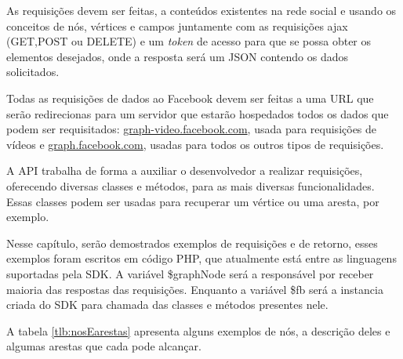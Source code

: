 As requisições devem ser feitas, a conteúdos existentes na rede social e usando os conceitos de nós, vértices e campos juntamente com as requisições ajax (GET,POST ou DELETE) e um \textit{token} de acesso para que se possa obter os elementos desejados, onde a resposta será um JSON contendo os dados solicitados.

Todas as requisições de dados ao Facebook devem ser feitas a uma URL que serão redirecionas para um servidor que estarão hospedados todos os dados que podem ser requisitados: \url{graph-video.facebook.com}, usada para requisições de vídeos e \url{graph.facebook.com}, usadas para todos os outros tipos de requisições.

A API trabalha de forma a auxiliar o desenvolvedor a realizar requisições, oferecendo diversas classes e métodos, para as mais diversas funcionalidades. Essas classes podem ser usadas para recuperar um vértice ou uma aresta, por exemplo.

Nesse capítulo, serão demostrados exemplos de requisições e de retorno, esses exemplos foram escritos em código PHP, que atualmente está entre as linguagens suportadas pela SDK. A variável \$graphNode será a responsável por receber maioria das respostas das requisições. Enquanto a variável \$fb será a instancia criada do SDK para chamada das classes e métodos presentes nele. 

A tabela \ref{tlb:nosEarestas} apresenta alguns exemplos de nós, a descrição deles e algumas arestas que cada pode alcançar.

